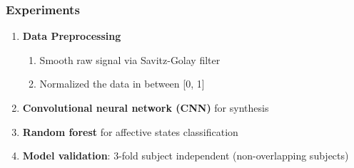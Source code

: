 \documentclass[unknownkeysallowed]{beamer}
\begin{document}
\begin{frame}
\frametitle{Experiments}

\begin{enumerate}[-]
    \item \textbf{Data Preprocessing}
        \begin{enumerate}[1.]
            \item Smooth raw signal via Savitz-Golay filter
            \item Normalized the data in between [0, 1] \newline 
        \end{enumerate}
        
    \pause \item \textbf{Convolutional neural network (CNN)} for synthesis \newline
    
    \item \textbf{Random forest} for affective states classification \newline 
    
    \pause \item \textbf{Model validation}: 3-fold subject independent (non-overlapping subjects) \newline 
\end{enumerate}

\end{frame}
\end{document}
